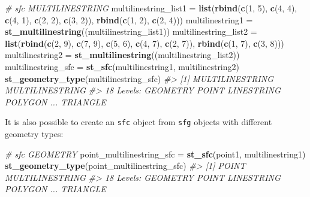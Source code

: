 \documentclass[]{krantz}
\newenvironment{Shaded}{\begin{snugshade}}{\end{snugshade}}
\newcommand{\CommentTok}[1]{\textcolor[rgb]{0.37,0.37,0.37}{\textit{#1}}}
\newcommand{\DecValTok}[1]{\textcolor[rgb]{0.06,0.06,0.06}{#1}}
\newcommand{\KeywordTok}[1]{\textcolor[rgb]{0.27,0.27,0.27}{\textbf{#1}}}
\newcommand{\NormalTok}[1]{#1}
\newcommand{\StringTok}[1]{\textcolor[rgb]{0.5,0.5,0.5}{#1}}
\begin{document}
\begin{Shaded}
\begin{Highlighting}[]
\CommentTok{# sfc MULTILINESTRING}
\NormalTok{multilinestring_list1 =}\StringTok{ }\KeywordTok{list}\NormalTok{(}\KeywordTok{rbind}\NormalTok{(}\KeywordTok{c}\NormalTok{(}\DecValTok{1}\NormalTok{, }\DecValTok{5}\NormalTok{), }\KeywordTok{c}\NormalTok{(}\DecValTok{4}\NormalTok{, }\DecValTok{4}\NormalTok{), }\KeywordTok{c}\NormalTok{(}\DecValTok{4}\NormalTok{, }\DecValTok{1}\NormalTok{), }\KeywordTok{c}\NormalTok{(}\DecValTok{2}\NormalTok{, }\DecValTok{2}\NormalTok{), }\KeywordTok{c}\NormalTok{(}\DecValTok{3}\NormalTok{, }\DecValTok{2}\NormalTok{)), }
                            \KeywordTok{rbind}\NormalTok{(}\KeywordTok{c}\NormalTok{(}\DecValTok{1}\NormalTok{, }\DecValTok{2}\NormalTok{), }\KeywordTok{c}\NormalTok{(}\DecValTok{2}\NormalTok{, }\DecValTok{4}\NormalTok{)))}
\NormalTok{multilinestring1 =}\StringTok{ }\KeywordTok{st_multilinestring}\NormalTok{((multilinestring_list1))}
\NormalTok{multilinestring_list2 =}\StringTok{ }\KeywordTok{list}\NormalTok{(}\KeywordTok{rbind}\NormalTok{(}\KeywordTok{c}\NormalTok{(}\DecValTok{2}\NormalTok{, }\DecValTok{9}\NormalTok{), }\KeywordTok{c}\NormalTok{(}\DecValTok{7}\NormalTok{, }\DecValTok{9}\NormalTok{), }\KeywordTok{c}\NormalTok{(}\DecValTok{5}\NormalTok{, }\DecValTok{6}\NormalTok{), }\KeywordTok{c}\NormalTok{(}\DecValTok{4}\NormalTok{, }\DecValTok{7}\NormalTok{), }\KeywordTok{c}\NormalTok{(}\DecValTok{2}\NormalTok{, }\DecValTok{7}\NormalTok{)), }
                            \KeywordTok{rbind}\NormalTok{(}\KeywordTok{c}\NormalTok{(}\DecValTok{1}\NormalTok{, }\DecValTok{7}\NormalTok{), }\KeywordTok{c}\NormalTok{(}\DecValTok{3}\NormalTok{, }\DecValTok{8}\NormalTok{)))}
\NormalTok{multilinestring2 =}\StringTok{ }\KeywordTok{st_multilinestring}\NormalTok{((multilinestring_list2))}
\NormalTok{multilinestring_sfc =}\StringTok{ }\KeywordTok{st_sfc}\NormalTok{(multilinestring1, multilinestring2)}
\KeywordTok{st_geometry_type}\NormalTok{(multilinestring_sfc)}
\CommentTok{#> [1] MULTILINESTRING MULTILINESTRING}
\CommentTok{#> 18 Levels: GEOMETRY POINT LINESTRING POLYGON ... TRIANGLE}
\end{Highlighting}
\end{Shaded}

It is also possible to create an \texttt{sfc} object from \texttt{sfg} objects with different geometry types:

\begin{Shaded}
\begin{Highlighting}[]
\CommentTok{# sfc GEOMETRY}
\NormalTok{point_multilinestring_sfc =}\StringTok{ }\KeywordTok{st_sfc}\NormalTok{(point1, multilinestring1)}
\KeywordTok{st_geometry_type}\NormalTok{(point_multilinestring_sfc)}
\CommentTok{#> [1] POINT           MULTILINESTRING}
\CommentTok{#> 18 Levels: GEOMETRY POINT LINESTRING POLYGON ... TRIANGLE}
\end{Highlighting}
\end{Shaded}
\end{document}
